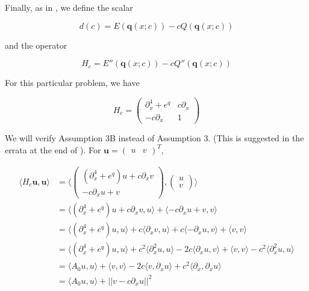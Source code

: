 \documentclass[12pt]{article}
\begin{document}
Finally, as in \cite{Grillakis1987}, we define the scalar

\begin{equation}\label{defd}
d(c) = E(\textbf{q}(x; c)) - c Q(\textbf{q}(x; c))
\end{equation}

and the operator 

\begin{equation}\label{defHc}
H_c = E''(\textbf{q}(x; c)) - c Q''(\textbf{q}(x; c))
\end{equation}

For this particular problem, we have

\begin{equation}
H_c = \begin{pmatrix}
\partial_x^4 + e^q & c \partial_x \\
-c \partial_x & 1
\end{pmatrix}
\end{equation}

We will verify Assumption 3B instead of Assumption 3. (This is suggested in the errata at the end of \cite{Grillakis1990}). For $\textbf{u} = \begin{pmatrix}u & v\end{pmatrix}^T$, 

\begin{align*}
\langle H_c \textbf{u}, \textbf{u} \rangle
&= \langle \begin{pmatrix} (\partial_x^4 + e^q)u + c \partial_x v \\ -c \partial_x u + v  \end{pmatrix},
\begin{pmatrix} u \\ v \end{pmatrix} \rangle \\ 
&= \langle (\partial_x^4 + e^q)u + c \partial_x v, u \rangle + \langle -c \partial_x u + v, v\rangle \\
&= \langle (\partial_x^4 + e^q)u, u \rangle + c \langle \partial_x v, u \rangle + c \langle -\partial_x u, v \rangle + \langle v, v \rangle \\
&= \langle (\partial_x^4 + e^q)u, u \rangle + c^2 \langle \partial_x^2 u, u \rangle - 2 c \langle \partial_x u, v \rangle + \langle v, v \rangle - c^2 \langle \partial_x^2 u, u \rangle\\
&= \langle A_0 u, u \rangle + \langle v, v \rangle - 2 c \langle v, \partial_x u \rangle + c^2 \langle \partial_x, \partial_x u \rangle\\
&= \langle A_0 u, u \rangle + || v - c \partial_x u||^2
\end{align*}
\end{document}
